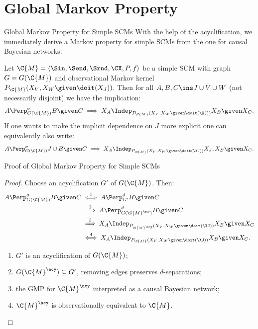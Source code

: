 \part{Global Markov Property}
\frame{\partpage}

\begin{frame}{Global Markov Property for Simple SCMs}
  With the help of the acyclification, we immediately derive a Markov property for simple SCMs from the one for causal Bayesian networks:
  \begin{Cor}
  Let $\C{M} = \langle \Sin, \Send, \Srnd, \CX, P, f \rangle$ be a simple SCM with graph $G = G(\C{M})$
  and observational Markov kernel $P_{\C{M}}(X_V,X_W \given \doit(X_J))$.
  Then for all $A, B, C \ins J \cup V \cup W$ (not necessarily disjoint) we have the implication:
  $$A \Perp^\sigma_{G(\C{M})} B \given C \implies X_A \Indep_{P_{\C{M}}(X_V,X_W \given \doit(\XJ))} X_B \given X_C.$$
  If one wants to make the implicit dependence on $J$ more explicit one can equivalently also write:
    $$A \Perp^\sigma_{G(\C{M})} J \cup B \given C \implies X_A \Indep_{P_{\C{M}}(X_V,X_W \given \doit(\XJ))} X_J,X_B \given X_C.$$
\end{Cor}
\end{frame}
\begin{frame}{Proof of Global Markov Property for Simple SCMs}
\begin{proof}
  \setlength\abovedisplayskip{10pt}
  \setlength\belowdisplayskip{0pt}
  Choose an acyclification $G'$ of $G(\C{M})$. Then:
  \begin{align*}
    A \Perp^\sigma_{G(\C{M})} B \given C &\stackrel{1}{\iff} A \Perp^d_{G'} B \given C \\
    &\stackrel{2}{\implies} A \Perp^d_{G(\C{M}^\acy)} B \given C \\
    &\stackrel{3}{\implies} X_A \Indep_{P_{\C{M}^{\acy}}(X_V,X_W \given \doit(\XJ))} X_B \given X_C \\
    &\stackrel{4}{\iff} X_A \Indep_{P_{\C{M}}(X_V,X_W \given \doit(\XJ))} X_B \given X_C.
  \end{align*}
  \begin{enumerate}
    \item $G'$ is an acyclification of $G(\C{M})$; 
    \item $G(\C{M}^\acy) \subseteq G'$, removing edges preserves $d$-separations; 
    \item the GMP for $\C{M}^\acy$ interpreted as a causal Bayesian network;
    \item $\C{M}^\acy$ is observationally equivalent to $\C{M}$.
  \end{enumerate}
\end{proof}
\end{frame}

